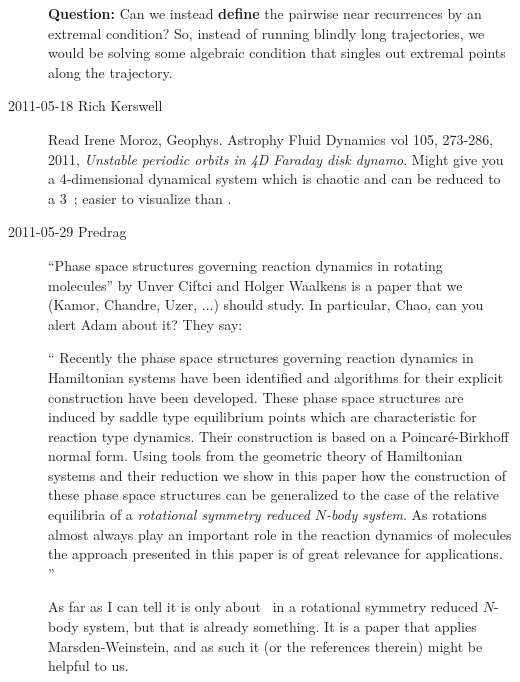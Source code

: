\begin{description}
\textbf{Question:} Can we instead {\bf define}
the pairwise near recurrences by an extremal
condition? So, instead of running blindly long trajectories, we would
be solving some algebraic condition that singles out extremal points
along the trajectory.

\item[2011-05-18  Rich Kerswell] Read
Irene Moroz,
Geophys. Astrophy Fluid Dynamics vol 105, 273-286, 2011,
\emph{Unstable periodic orbits in 4D Faraday disk dynamo}.
Might give you a 4-dimensional dynamical system which is
chaotic and can be reduced to a 3\dmn\ \statesp; easier to
visualize than {\cLf}.

\item[2011-05-29 Predrag]
{``Phase space structures} governing reaction dynamics in rotating molecules''
by Unver Ciftci and Holger Waalkens is a paper that we (Kamor, Chandre,
Uzer, ...) should study. In particular, Chao, can you alert Adam about
it? They say:

``
Recently the phase space structures governing reaction dynamics in
Hamiltonian systems have been identified and algorithms for their
explicit construction have been developed. These phase space structures
are induced by saddle type equilibrium points which are characteristic
for reaction type dynamics. Their construction is based on a
Poincar{\'e}-Birkhoff normal form. Using tools from the geometric theory
of Hamiltonian systems and their reduction we show in this paper how the
construction of these phase space structures can be generalized to the
case of the relative equilibria of a \emph{rotational symmetry reduced
$N$-body system}. As rotations almost always play an important role in
the reaction dynamics of molecules the approach presented in this paper
is of great relevance for applications.
''

As far as I can tell it is only about \reqva\ in a rotational symmetry
reduced $N$-body system, but that is already something. It is a paper
that applies Marsden-Weinstein, and as such it (or the references
therein) might be helpful to us.


\end{description}
